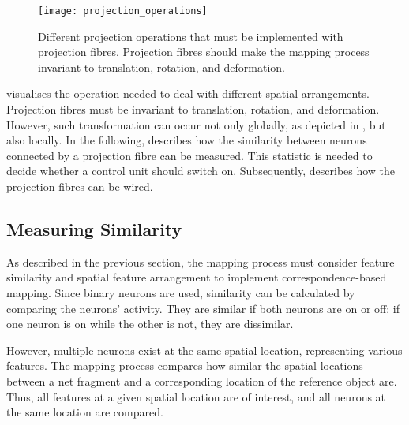 \begin{figure}[h]
    \centering
    \texttt{[image: projection\_operations]}
    \caption[Different projection operation]{Different projection operations that must be implemented with projection fibres. Projection fibres should make the mapping process invariant to translation, rotation, and deformation.}
\end{figure}
 visualises the operation needed to deal with different spatial arrangements.
Projection fibres must be invariant to translation, rotation, and deformation. However, such transformation can occur not only globally, as depicted in , but also locally.
In the following,  describes how the similarity between neurons connected by a projection fibre can be measured. This statistic is needed to decide whether a control unit should switch on. Subsequently,  describes how the projection fibres can be wired.

\subsection{Measuring Similarity}
As described in the previous section, the mapping process must consider feature similarity and spatial feature arrangement to implement correspondence-based mapping.
Since binary neurons are used, similarity can be calculated by comparing the neurons' activity. They are similar if both neurons are on or off; if one neuron is on while the other is not, they are dissimilar.

However, multiple neurons exist at the same spatial location, representing various features.
The mapping process compares how similar the spatial locations between a net fragment and a corresponding location of the reference object are.
Thus, all features at a given spatial location are of interest, and all neurons at the same location are compared.

